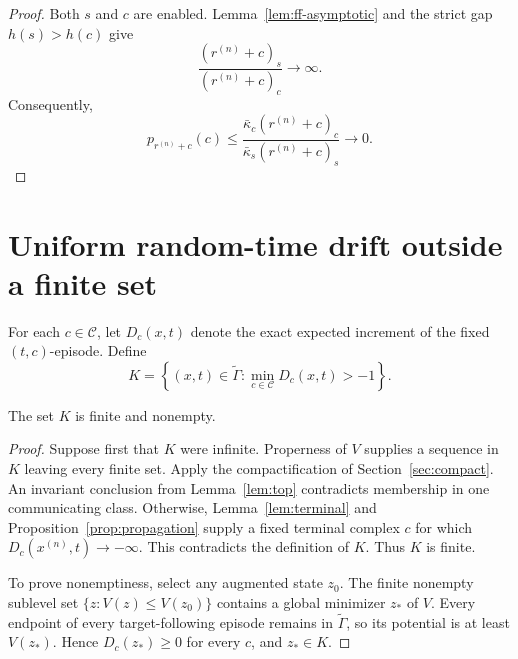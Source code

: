 \begin{proof}
Both \(s\) and \(c\) are enabled.  Lemma~\ref{lem:ff-asymptotic} and the
strict gap \(h(s)>h(c)\) give
\[
  \frac{(r^{(n)}+c)_s}{(r^{(n)}+c)_c}\longrightarrow\infty.
\]
Consequently,
\[
 p_{r^{(n)}+c}(c)
 \le
 \frac{\bar\kappa_c(r^{(n)}+c)_c}
      {\bar\kappa_s(r^{(n)}+c)_s}
 \longrightarrow0.
\]
\end{proof}

\section{Uniform random-time drift outside a finite set}\label{sec:uniform}

For each \(c\in\mathcal C\), let \(D_c(x,t)\) denote the exact expected
increment of the fixed \((t,c)\)-episode.  Define
\begin{equation}\label{eq:K}
 K=\left\{(x,t)\in\widetilde\Gamma:
          \min_{c\in\mathcal C}D_c(x,t)>-1\right\}.
\end{equation}

\begin{proposition}\label{prop:K}
The set \(K\) is finite and nonempty.
\end{proposition}

\begin{proof}
Suppose first that \(K\) were infinite.  Properness of \(V\) supplies a
sequence in \(K\) leaving every finite set.  Apply the compactification of
Section~\ref{sec:compact}.  An invariant conclusion from
Lemma~\ref{lem:top} contradicts membership in one communicating class.
Otherwise, Lemma~\ref{lem:terminal} and
Proposition~\ref{prop:propagation} supply a fixed terminal complex \(c\) for
which \(D_c(x^{(n)},t)\to-\infty\).  This contradicts the definition of
\(K\).  Thus \(K\) is finite.

To prove nonemptiness, select any augmented state \(z_0\).  The finite
nonempty sublevel set \(\{z:V(z)\le V(z_0)\}\) contains a global minimizer
\(z_*\) of \(V\).  Every endpoint of every target-following episode remains
in \(\widetilde\Gamma\), so its potential is at least \(V(z_*)\).  Hence
\(D_c(z_*)\ge0\) for every \(c\), and \(z_*\in K\).
\end{proof}

